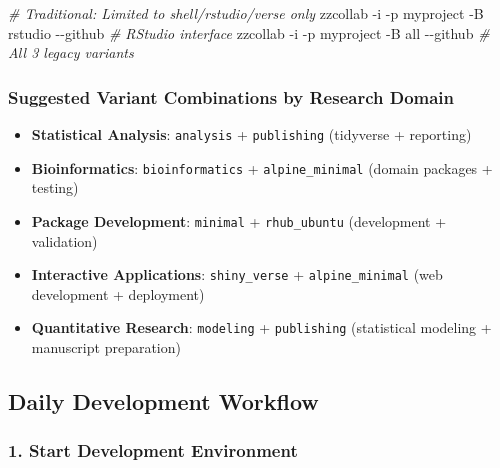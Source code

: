 \documentclass[
]{article}
\newenvironment{Shaded}{\begin{snugshade}}{\end{snugshade}}
\newcommand{\AttributeTok}[1]{\textcolor[rgb]{0.13,0.29,0.53}{#1}}
\newcommand{\CommentTok}[1]{\textcolor[rgb]{0.56,0.35,0.01}{\textit{#1}}}
\newcommand{\ExtensionTok}[1]{#1}
\newcommand{\NormalTok}[1]{#1}
\providecommand{\tightlist}{%
  \setlength{\itemsep}{0pt}\setlength{\parskip}{0pt}}
\begin{document}
\begin{Shaded}
\begin{Highlighting}[]
\CommentTok{\# Traditional: Limited to shell/rstudio/verse only}
\ExtensionTok{zzcollab} \AttributeTok{{-}i} \AttributeTok{{-}p}\NormalTok{ myproject }\AttributeTok{{-}B}\NormalTok{ rstudio }\AttributeTok{{-}{-}github}    \CommentTok{\# RStudio interface}
\ExtensionTok{zzcollab} \AttributeTok{{-}i} \AttributeTok{{-}p}\NormalTok{ myproject }\AttributeTok{{-}B}\NormalTok{ all }\AttributeTok{{-}{-}github}        \CommentTok{\# All 3 legacy variants}
\end{Highlighting}
\end{Shaded}

\subsubsection{Suggested Variant Combinations by Research
Domain}\label{suggested-variant-combinations-by-research-domain}

\begin{itemize}
\tightlist
\item
  \textbf{Statistical Analysis}: \texttt{analysis} + \texttt{publishing}
  (tidyverse + reporting)
\item
  \textbf{Bioinformatics}: \texttt{bioinformatics} +
  \texttt{alpine\_minimal} (domain packages + testing)
\item
  \textbf{Package Development}: \texttt{minimal} + \texttt{rhub\_ubuntu}
  (development + validation)
\item
  \textbf{Interactive Applications}: \texttt{shiny\_verse} +
  \texttt{alpine\_minimal} (web development + deployment)
\item
  \textbf{Quantitative Research}: \texttt{modeling} +
  \texttt{publishing} (statistical modeling + manuscript preparation)
\end{itemize}

\subsection{Daily Development
Workflow}\label{daily-development-workflow}

\subsubsection{1. Start Development
Environment}\label{start-development-environment}
\end{document}
